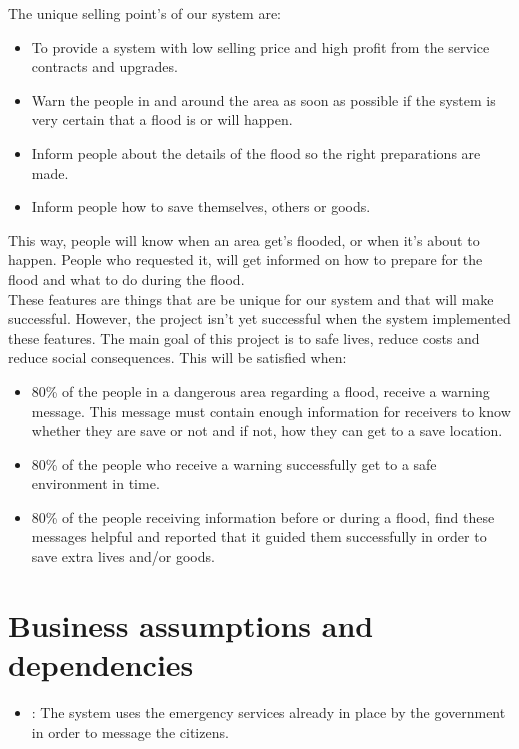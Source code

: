 

The unique selling point's of our system are: 
\begin{itemize}
	\item To provide a system with low selling price and high profit from the service contracts and upgrades.
	\item Warn the people in and around the area as soon as possible if the system is very certain that a flood is or will happen.
	\item Inform people about the details of the flood so the right preparations are made. 
	\item Inform people how to save themselves, others or goods.
\end{itemize}

This way, people will know when an area get's flooded, or when it's about to happen. People who requested it, will get informed on how to prepare for the flood and what to do during the flood.\\
These features are things that are be unique for our system and that will make successful. However, the project isn't yet successful when the system implemented these features. The main goal of this project is to safe lives, reduce costs and reduce social consequences. This will be satisfied when:
\begin{itemize}
	\item 80\% of the people in a dangerous area regarding a flood, receive a warning message. This message must contain enough information for receivers to know whether they are save or not and if not, how they can get to a save location.
	\item 80\% of the people who receive a warning successfully get to a safe environment in time.
	\item 80\% of the people receiving information before or during a flood, find these messages helpful and reported that it guided them successfully in order to save extra lives and/or goods.
\end{itemize}

\section{Business assumptions and dependencies}
\begin{itemize}
	\item {}: The system uses the emergency services already in place by the government in order to message the citizens.
	
\end{itemize}

